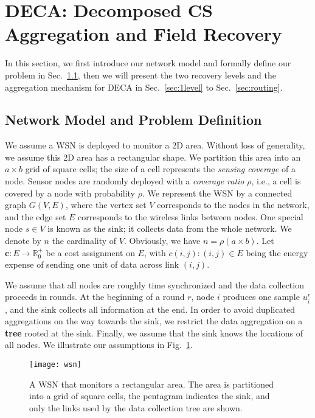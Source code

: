 \documentclass[conference]{IEEEtran}
\begin{document}
\section{DECA: Decomposed CS Aggregation and Field Recovery} \label{sec:deca}
In this section, we first introduce our network model and formally define our problem in Sec.~\ref{sec:netmodel}, then we will present the two recovery levels and the aggregation mechanism for DECA in Sec.~\ref{sec:1level} to Sec.~\ref{sec:routing}.

  \subsection{Network Model and Problem Definition} \label{sec:netmodel}
We assume a WSN is deployed to monitor a 2D area. Without loss of generality, we assume this 2D area has a rectangular shape. We partition this area into an $a \times b$ grid of square cells; the size of a cell represents the \textit{sensing coverage} of a node. Sensor nodes are randomly deployed with a \textit{coverage ratio} $\rho$, i.e., a cell is covered by a node with probability $\rho$. We represent the WSN by a connected graph $G(V, E)$, where the vertex set $V$ corresponds to the nodes in the network, and the edge set $E$ corresponds to the wireless links between nodes. One special node $s \in V$ is known as the sink; it collects data from the whole network. We denote by $n$ the cardinality of $V$. Obviously, we have $n = \rho(a\times b)$. Let $\mathbf{c}\!: E \rightarrow \mathbb{R}_{0}^{+}$ be a cost assignment on $E$, with $c(i,j)\!: (i,j) \in E$ being the energy expense of sending one unit of data across link $(i,j)$.

    We assume that all nodes are roughly time synchronized and the data collection proceeds in rounds. At the beginning of a round $r$, node $i$ produces one sample $u^r_i$, and the sink collects all information at the end. In order to avoid duplicated aggregations on the way towards the sink, we restrict the data aggregation on a \textbf{tree} rooted at the sink. Finally, we assume that the sink knows the locations of all nodes. We illustrate our assumptions in Fig.~\ref{fig:wsn}.
    \begin{figure}[h]
      \centering
      \texttt{[image: wsn]}
      \caption{A WSN that monitors a rectangular area. The area is partitioned into a grid of square cells, the pentagram indicates the sink, and only the links used by the data collection tree are shown.} \label{fig:wsn}
\end{figure}
\end{document}
